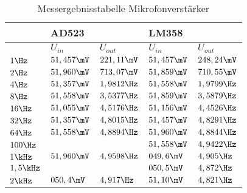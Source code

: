 \begin{table}[]
\centering
\caption{Messergebnisstabelle Mikrofonverstärker}
\label{tab:Mikrofon_erg_tab}
\begin{tabular}{l||l|l||l|l|}
\cline{2-5}
                                                & \multicolumn{2}{l|}{AD523} & \multicolumn{2}{l|}{LM358} \\ \hline
\rowcolor[HTML]{C0C0C0} 
\multicolumn{1}{|l|}{\cellcolor[HTML]{C0C0C0}$f$} &$ U_{in}       $&$ U_{out}     $&$ U_{in}       $&$ U_{out}  $\\ \hline
\multicolumn{1}{|l|}{$1\Hz$}                         &$ 51,457\mV    $&$ 221,11\mV   $&$ 51,457\mV   $&$ 248,24\mV    $\\ \hline
\multicolumn{1}{|l|}{$2\Hz$}                         &$ 51,960\mV    $&$ 713,07\mV   $&$ 51,859\mV   $&$ 710,55\mV    $\\ \hline
\multicolumn{1}{|l|}{$4\Hz$}                         &$ 51,357\mV    $&$ 1,9812\Hz      $&$ 51,558\mV   $&$ 1,9799\Hz       $\\ \hline
\multicolumn{1}{|l|}{$8\Hz$}                         &$ 51,558\mV    $&$ 3,5377\Hz      $&$ 51,859\mV   $&$ 3,5879\Hz       $\\ \hline
\multicolumn{1}{|l|}{$16\Hz$}                        &$ 51,055\mV    $&$ 4,5176\Hz      $&$ 51,156\mV   $&$ 4,4526\Hz       $\\ \hline
\multicolumn{1}{|l|}{$32\Hz$}                        &$ 51,357\mV    $&$ 4,8015\Hz      $&$ 51,457\mV   $&$ 4,8291\Hz       $\\ \hline
\multicolumn{1}{|l|}{$64\Hz$}                        &$ 51,558\mV    $&$ 4,8894\Hz      $&$ 51,960\mV   $&$ 4,8844\Hz       $\\ \hline
\multicolumn{1}{|l|}{$100\Hz$}                       &$              $&$             $&$ 51,558\mV   $&$ 4,9422\Hz       $\\ \hline
\multicolumn{1}{|l|}{$1\kHz$}                       &$ 51,960\mV    $&$ 4,9598\Hz      $&$ 049,6\mV    $&$ 4,905\Hz        $\\ \hline
\multicolumn{1}{|l|}{$1,5\kHz$}                     &$              $&$             $&$ 050,5\mV    $&$ 4,872\Hz        $\\ \hline
\multicolumn{1}{|l|}{$2\kHz$}                       &$ 050,4\mV     $&$ 4,917\Hz       $&$ 51,10\mV    $&$ 4,821\Hz        $\\ \hline

\end{tabular}
\end{table}

